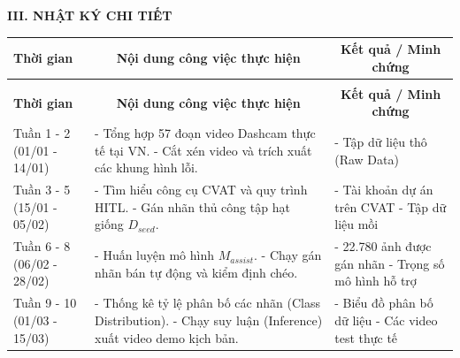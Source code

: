 \textbf{III. NHẬT KÝ CHI TIẾT}

\begin{center}
	\renewcommand{\arraystretch}{1.5}
	\begin{longtable}{|>{\centering\arraybackslash}p{2.5cm}|p{6.5cm}|p{5cm}|}
		\hline
		\textbf{Thời gian} & \multicolumn{1}{c|}{\textbf{Nội dung công việc thực hiện}} & \multicolumn{1}{c|}{\textbf{Kết quả / Minh chứng}} \\
		\hline
		\endfirsthead
		
		\multicolumn{3}{c}{\textit{(Tiếp tục từ trang trước)}} \\
		\hline
		\textbf{Thời gian} & \multicolumn{1}{c|}{\textbf{Nội dung công việc thực hiện}} & \multicolumn{1}{c|}{\textbf{Kết quả / Minh chứng}} \\
		\hline
		\endhead
		
		\hline
		\endfoot
		\endlastfoot
		
		Tuần 1 - 2 \newline (01/01 - 14/01) & 
		- Tổng hợp 57 đoạn video Dashcam thực tế tại VN. \newline
		- Cắt xén video và trích xuất các khung hình lỗi. & 
		- Tập dữ liệu thô (Raw Data) \\
		\hline
		
		Tuần 3 - 5 \newline (15/01 - 05/02) & 
		- Tìm hiểu công cụ CVAT và quy trình HITL. \newline
		- Gán nhãn thủ công tập hạt giống $D_{seed}$. & 
		- Tài khoản dự án trên CVAT \newline
		- Tập dữ liệu mồi \\
		\hline
		
		Tuần 6 - 8 \newline (06/02 - 28/02) & 
		- Huấn luyện mô hình $M_{assist}$. \newline
		- Chạy gán nhãn bán tự động và kiểm định chéo. & 
		- 22.780 ảnh được gán nhãn \newline
		- Trọng số mô hình hỗ trợ \\
		\hline
		
		Tuần 9 - 10 \newline (01/03 - 15/03) & 
		- Thống kê tỷ lệ phân bố các nhãn (Class Distribution). \newline
		- Chạy suy luận (Inference) xuất video demo kịch bản. & 
		- Biểu đồ phân bố dữ liệu \newline
		- Các video test thực tế \\
		\hline
	\end{longtable}
\end{center}

